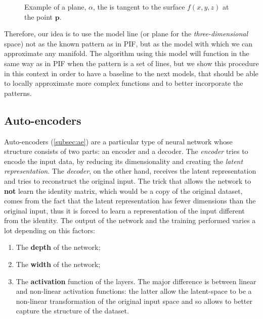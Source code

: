 \begin{figure}[htb]
    \centering
    
    \caption{Example of a plane, $\alpha$, the is tangent to the surface $f(x, y, z)$ at the point $\textbf{p}$.}
    \label{fig:local_plane}
\end{figure}

Therefore, our idea is to use the model line (or plane for the \textit{three-dimensional} space) not as the known pattern as in PIF, but as the model with which we can approximate any manifold. The algorithm using this model will function in the same way as in PIF when the pattern is a set of lines, but we show 
this procedure in this context in order to have a baseline to the next models, that should be able to locally approximate more complex functions and to better incorporate the patterns.

\subsection{Auto-encoders}
Auto-encoders (\ref{subsec:ae}) are a particular type of neural network whose structure consists of two parts: an encoder and a decoder. \newline
The \textit{encoder} tries to encode the input data, by reducing its dimensionality and creating the \textit{latent representation}. The \textit{decoder}, on the other hand, receives the latent representation and tries to reconstruct the original input. The trick that allows the network to \textbf{not} learn the identity matrix, which would be a copy of the original dataset, comes from the fact that the latent representation has fewer dimensions than the original input, thus it is forced to learn a representation of the input different from the identity. \newline
The output of the network and the training performed varies a lot depending on this factors:
\begin{enumerate}
    \item The \textbf{depth} of the network;
    \item The \textbf{width} of the network;
    \item The \textbf{activation} function of the layers. The major difference is between linear and non-linear activation functions: the latter allow the latent-space to be a non-linear transformation of the original input space and so allows to better capture the structure of the dataset.
\end{enumerate}

